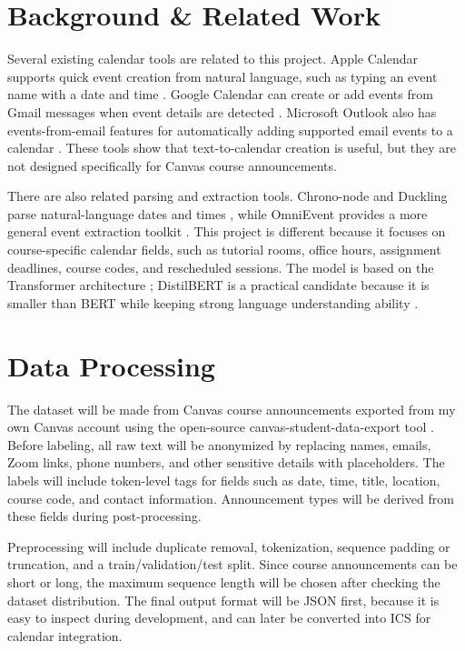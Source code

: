 \documentclass[final]{article}
\begin{document}
\section*{Background \& Related Work}
Several existing calendar tools are related to this project. Apple Calendar supports quick event creation from natural language, such as typing an event name with a date and time \citep{applecalendar}. Google Calendar can create or add events from Gmail messages when event details are detected \citep{googlecalendar}. Microsoft Outlook also has events-from-email features for automatically adding supported email events to a calendar \citep{outlookcalendar}. These tools show that text-to-calendar creation is useful, but they are not designed specifically for Canvas course announcements.

There are also related parsing and extraction tools. Chrono-node and Duckling parse natural-language dates and times \citep{chrono,duckling}, while OmniEvent provides a more general event extraction toolkit \citep{li2023omnievent}. This project is different because it focuses on course-specific calendar fields, such as tutorial rooms, office hours, assignment deadlines, course codes, and rescheduled sessions. The model is based on the Transformer architecture \citep{vaswani2017attention}; DistilBERT is a practical candidate because it is smaller than BERT while keeping strong language understanding ability \citep{sanh2019distilbert}.

\section*{Data Processing}
The dataset will be made from Canvas course announcements exported from my own Canvas account using the open-source canvas-student-data-export tool \citep{canvasexport}. Before labeling, all raw text will be anonymized by replacing names, emails, Zoom links, phone numbers, and other sensitive details with placeholders. The labels will include token-level tags for fields such as date, time, title, location, course code, and contact information. Announcement types will be derived from these fields during post-processing.

Preprocessing will include duplicate removal, tokenization, sequence padding or truncation, and a train/validation/test split. Since course announcements can be short or long, the maximum sequence length will be chosen after checking the dataset distribution. The final output format will be JSON first, because it is easy to inspect during development, and can later be converted into ICS for calendar integration.
\end{document}
